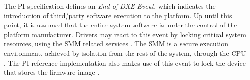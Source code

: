 The \ac{PI} specification defines an \emph{End of \acs{DXE} Event}, which indicates the introduction of third\-/party software execution to the platform.
Up until this point, it is assumed that the entire system software is under the control of the platform manufacturer.
Drivers may react to this event by locking critical system resources, using the \ac{SMM} related services \cite[Vol. 2, 5.1.2.1]{pi-spec}.
The \ac{SMM} is a secure execution environment, achieved by isolation from the rest of the system, through the \ac{CPU} \cite[Vol. 4, Section 1.3]{pi-spec}.
The \ac{PI} reference implementation also makes use of this event to lock the device that stores the firmware image \cite{tianocore-edk2-fmpdxe}.
